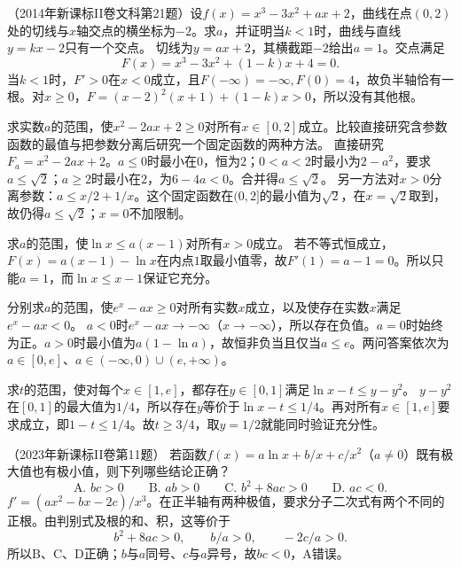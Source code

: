 （2014年新课标II卷文科第21题）设\(f(x)=x^3-3x^2+ax+2\)，曲线在点\((0,2)\)处的切线与\(x\)轴交点的横坐标为\(-2\)。求\(a\)，并证明当\(k<1\)时，曲线与直线\(y=kx-2\)只有一个交点。
\solutionanswer
切线为\(y=ax+2\)，其横截距\(-2\)给出\(a=1\)。交点满足
\[
 F(x)=x^3-3x^2+(1-k)x+4=0.
\]
当\(k<1\)时，\(F'>0\)在\(x<0\)成立，且\(F(-\infty)=-\infty,F(0)=4\)，故负半轴恰有一根。对\(x\ge0\)，\(F=(x-2)^2(x+1)+(1-k)x>0\)，所以没有其他根。


求实数\(a\)的范围，使\(x^2-2ax+2\ge0\)对所有\(x\in[0,2]\)成立。比较直接研究含参数函数的最值与把参数分离后研究一个固定函数的两种方法。
\solutionanswer
直接研究\(F_a=x^2-2ax+2\)。\(a\le0\)时最小在\(0\)，恒为\(2\)；\(0<a<2\)时最小为\(2-a^2\)，要求\(a\le\sqrt2\)；\(a\ge2\)时最小在\(2\)，为\(6-4a<0\)。合并得\(a\le\sqrt2\)。
另一方法对\(x>0\)分离参数：\(a\le x/2+1/x\)。这个固定函数在\((0,2]\)的最小值为\(\sqrt2\)，在\(x=\sqrt2\)取到，故仍得\(a\le\sqrt2\)；\(x=0\)不加限制。


求\(a\)的范围，使\(\ln x\le a(x-1)\)对所有\(x>0\)成立。
\solutionanswer
若不等式恒成立，\(F(x)=a(x-1)-\ln x\)在内点\(1\)取最小值零，故\(F'(1)=a-1=0\)。所以只能\(a=1\)，而\(\ln x\le x-1\)保证它充分。


分别求\(a\)的范围，使\(e^x-ax\ge0\)对所有实数\(x\)成立，以及使存在实数\(x\)满足\(e^x-ax<0\)。
\solutionanswer
\(a<0\)时\(e^x-ax\to-\infty\)（\(x\to-\infty\)），所以存在负值。\(a=0\)时始终为正。\(a>0\)时最小值为\(a(1-\ln a)\)，故恒非负当且仅当\(a\le e\)。两问答案依次为\(a\in[0,e]\)、\(a\in(-\infty,0)\cup(e,+\infty)\)。


求\(t\)的范围，使对每个\(x\in[1,e]\)，都存在\(y\in[0,1]\)满足\(\ln x-t\le y-y^2\)。
\solutionanswer
\(y-y^2\)在\([0,1]\)的最大值为\(1/4\)，所以存在\(y\)等价于\(\ln x-t\le1/4\)。再对所有\(x\in[1,e]\)要求成立，即\(1-t\le1/4\)。故\(t\ge3/4\)，取\(y=1/2\)就能同时验证充分性。


（2023年新课标II卷第11题）
若函数\(f(x)=a\ln x+b/x+c/x^2\)（\(a\ne0\)）既有极大值也有极小值，则下列哪些结论正确？
\begin{equation*}
 \text{A. }bc>0\qquad \text{B. }ab>0\qquad
 \text{C. }b^2+8ac>0\qquad \text{D. }ac<0.
\end{equation*}
\solutionanswer
\(f'=(ax^2-bx-2c)/x^3\)。在正半轴有两种极值，要求分子二次式有两个不同的正根。由判别式及根的和、积，这等价于
\[
 b^2+8ac>0,\qquad b/a>0,\qquad -2c/a>0.
\]
所以B、C、D正确；\(b\)与\(a\)同号、\(c\)与\(a\)异号，故\(bc<0\)，A错误。


